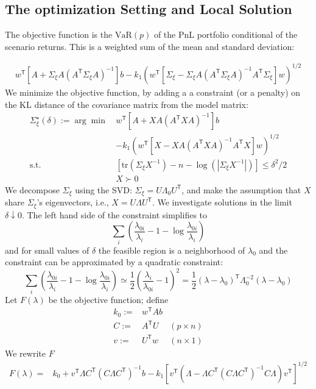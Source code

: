 \documentclass[letter, 12pt]{article}
\newcommand{\transpose}{^\mathsf{T}}
\newcommand{\trace}[1]{{\text{tr}}\left( #1 \right)}
\newcommand{\suchthat}{\text{s.t.}}
\newcommand{\inv}{^{-1}}
\begin{document}
\subsection{The optimization Setting and Local Solution}
The objective function is the $\text{VaR}(p)$ of the  PnL portfolio conditional of the scenario returns. This is a weighted sum of the mean and standard deviation:

\begin{align*} 
 w\transpose [A + \Sigma_\xi A (A\transpose \Sigma_\xi A)\inv] b - k_1( w\transpose [ \Sigma_\xi - \Sigma_\xi A ( A\transpose \Sigma_\xi A) \inv A\transpose \Sigma_\xi ] w)^{1/2}
\end{align*}
We minimize the objective function, by adding a a constraint (or a penalty) on the KL distance of the covariance matrix from the model matrix:
\begin{align*} 
\Sigma_\xi^\star (\delta) :=\arg\min \, & w\transpose [A + X A (A\transpose X  A)\inv] b \\
&- k_1( w\transpose [ X  - X  A ( A\transpose X  A) \inv A\transpose X  ] w)^{1/2} \\
\suchthat &[\trace{\Sigma_\xi X\inv} -n -\log( |\Sigma_\xi X\inv|)]\le \delta^2/2 \\
  & X \succ 0
\end{align*}
We decompose $\Sigma_\xi$ using the SVD: $\Sigma_\xi=U\Lambda_0 U\transpose$, and make the assumption that $X$ share $\Sigma_\xi$'s eigenvectors, i.e.,  $X=U\Lambda U\transpose $.
We investigate solutions in the limit $\delta \downarrow 0$. The left hand side of the constraint simplifies to
\[
\sum_i \left(
	\frac{\lambda_{0i}}{\lambda_{i}} -1 -\log \frac{\lambda_{0i}}{\lambda_{i}} 
\right)  
\]
and for small values of $\delta$ the feasible region is a neighborhood of $\lambda_0$ and the constraint can be approximated by a quadratic constraint:
\[
\sum_i \left(
	\frac{\lambda_{0i}}{\lambda_{i}} -1 -\log \frac{\lambda_{0i}}{\lambda_{i}} 
\right) \simeq \frac{1}{2} \left(  \frac{\lambda_{i}}{\lambda_{0i}}-1 \right)^2=\frac{1}{2}(\lambda-\lambda_0)\transpose \Lambda_0^{-2}(\lambda-\lambda_0)
\]
Let $F(\lambda)$ be the objective function; define 
\begin{align*}
k_0:= &w\transpose A b & \\
C:=&A \transpose U & (p\times n)\\ 
v:=&U\transpose w & (n\times 1)
\end{align*}
 We rewrite $F$
\begin{align*}
	F(\lambda) =& k_0+ v\transpose\Lambda C\transpose (C\Lambda C\transpose)\inv  b- k_1\left[v\transpose \left(\Lambda - \Lambda C\transpose (C\Lambda C\transpose)\inv C\Lambda \right) v\transpose \right]^{1/2}
\end{align*}
\end{document}
